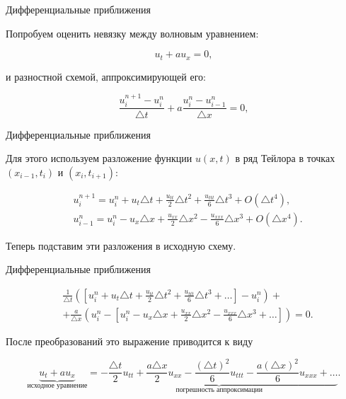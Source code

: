 \documentclass[10pt,xcolor=pst,aspectratio=169]{beamer}
\begin{document}
\begin{frame}{Дифференциальные приближения}

    \transdissolve[duration=0.1]
    \justifying
    \large

    Попробуем оценить невязку между волновым уравнением:

    \[
        u_{t} + a u_{x} = 0,
    \]

    и разностной схемой, аппроксимирующей его:

    \[
        \frac{u^{n + 1}_{i} - u^{n}_{i}}{\triangle t} + a \frac{u^{n}_{i} - u^{n}_{i - 1}}{\triangle x} = 0,
    \]

\end{frame}

\begin{frame}{Дифференциальные приближения}

    \transdissolve[duration=0.1]
    \justifying
    \large

    Для   этого   используем   разложение функции $u(x,t)$ в ряд Тейлора в точках $(x_{i - 1}, t_{i})$ и $(x_{i}, t_{i + 1})$:

    \[
        \begin{split}
            &u^{n + 1}_{i} = u^{n}_{i} + u_{t} \triangle t + \frac{u_{tt}}{2} \triangle t^{2} + \frac{u_{ttt}}{6} \triangle t^{3} + O(\triangle t^{4}),\\
            &u^{n}_{i - 1} = u^{n}_{i} - u_{x} \triangle x + \frac{u_{xx}}{2} \triangle x^{2} - \frac{u_{xxx}}{6} \triangle x^{3} + O(\triangle x^{4}).
        \end{split}
    \]

    Теперь подставим эти разложения в исходную схему.\\

\end{frame}

\begin{frame}{Дифференциальные приближения}

    \transdissolve[duration=0.1]
    \justifying
    \large

    \[
        \begin{split}
            &\frac{1}{\triangle t} \left( \left[ u^{n}_{i} + u_{t} \triangle t + \frac{u_{tt}}{2} \triangle t^{2} + \frac{u_{ttt}}{6} \triangle t^{3} + \ldots \right] - u^{n}_{i} \right) +\\
            &+ \frac{a}{\triangle x} \left( u^{n}_{i} - \left[ u^{n}_{i} - u_{x} \triangle x + \frac{u_{xx}}{2} \triangle x^{2} - \frac{u_{xxx}}{6} \triangle x^{3} + \ldots \right] \right) = 0.
        \end{split}
    \]

    После преобразований это выражение приводится к виду

    \[
        \underbrace{u_{t} + a u_{x}}_{\mbox{исходное уравнение}} = \underbrace{- \frac{\triangle t}{2} u_{tt} + \frac{a \triangle x}{2} u_{xx} - \frac{\left( \triangle t \right)^{2}}{6} u_{ttt} - \frac{a \left( \triangle x \right)^{2}}{6} u_{xxx} + \ldots}_{\mbox{погрешность аппроксимации}}.
    \]

\end{frame}
\end{document}
